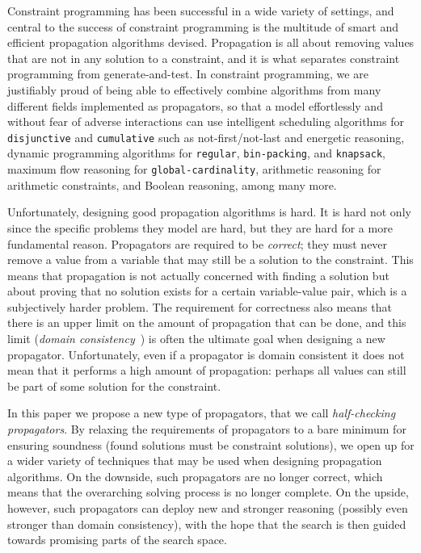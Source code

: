\documentclass[runningheads]{llncs}
\newcommand{\cons}[1]{\texttt{#1}}
\begin{document}
Constraint programming has been successful in a wide variety of
settings, and central to the success of constraint programming is
the multitude of smart and efficient propagation algorithms
devised. Propagation is all about removing values that are not in any
solution to a constraint, and it is what separates constraint
programming from generate-and-test. In constraint programming, we are
justifiably proud of being able to effectively combine algorithms from
many different fields implemented as propagators, so that a model
effortlessly and without fear of adverse interactions can use
intelligent scheduling algorithms for \cons{disjunctive} and
\cons{cumulative} such as not-first/not-last and energetic reasoning,
dynamic programming algorithms for \cons{regular}, \cons{bin-packing},
and \cons{knapsack}, maximum flow reasoning for
\cons{global-cardinality}, arithmetic reasoning for arithmetic
constraints, and Boolean reasoning, among many more.


Unfortunately, designing good propagation algorithms is hard. It is
hard not only since the specific problems they model are hard, but
they are hard for a more fundamental reason. Propagators are required
to be \emph{correct}; they must never remove a value from a variable
that may still be a solution to the constraint. This means that
propagation is not actually concerned with finding a solution but about
proving that no solution exists for a certain variable-value pair,
which is a subjectively harder problem. The requirement for
correctness also means that there is an upper limit on the amount of
propagation that can be done, and this limit (\emph{domain
  consistency}~\cite{mackworth77}) is
often the ultimate goal when designing a new
propagator. Unfortunately, even if a propagator is domain
consistent it does not mean that it performs a high amount of
propagation: perhaps all values can still be part of some solution for
the constraint.

In this paper we propose a new type of propagators, that we call
\emph{half-checking propagators}. By relaxing the requirements of
propagators to a bare minimum for ensuring soundness (found solutions
must be constraint solutions), we open up for a wider variety of
techniques that may be used when designing propagation algorithms. On
the downside, such propagators are no longer correct, which means that
the overarching solving process is no longer complete. On the upside,
however, such propagators can deploy new and stronger reasoning
(possibly even stronger than domain consistency), with the hope that
the search is then guided towards promising parts of the search space.
\end{document}
